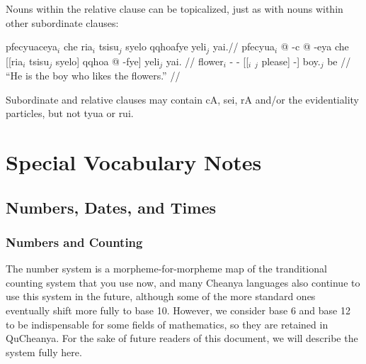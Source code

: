 \documentclass{article}
\begin{document}
Nouns within the relative clause can be topicalized, just as with nouns within other subordinate clauses:

\ex[lingstyle=QuCheanya] \begingl
\glpreamble pfecyuaceya$_i$ che ria$_i$ tsisu$_j$ syelo qqhoafye yeli$_j$ yai.//
\gla pfecyua$_i$ @ -c @ -eya che [[ria$_i$ tsisu$_j$ syelo] qqhoa @ -fye] yeli$_j$ yai. //
\glb flower$_i$ - -  [[$_i$ $_j$ please]  -] boy.$_j$ be //
\glft ``He is the boy who likes the flowers.'' //
\endgl \xe

Subordinate and relative clauses may contain {\quch cA}, {\quch sei}, {\quch rA} and/or the evidentiality particles, but not {\quch tyua} or {\quch rui}.

\section{Special Vocabulary Notes}
\subsection{Numbers, Dates, and Times}
\subsubsection{Numbers and Counting}

The number system is a morpheme-for-morpheme map of the tranditional counting system that you use now, and many Cheanya languages also continue to use this system in the future, although some of the more standard ones eventually shift more fully to base 10.  However, we consider base 6 and base 12 to be indispensable for some fields of mathematics, so they are retained in QuCheanya.  For the sake of future readers of this document, we will describe the system fully here.
\end{document}
